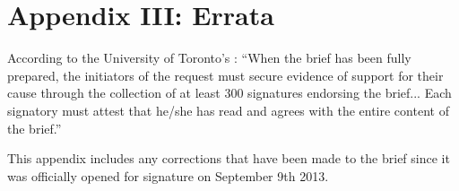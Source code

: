 

		\singlespacing
		\section{Appendix III: Errata}
		\label{sec:Errata}
		\doublespacing



According to the University of Toronto's : ``When the brief has been fully prepared, the initiators of the request must secure evidence of support for their cause through the collection of at least 300 signatures endorsing the brief... Each signatory must attest that he/she has read and agrees with the entire content of the brief.''



This appendix includes any corrections that have been made to the brief since it was officially opened for signature on September 9th 2013.



